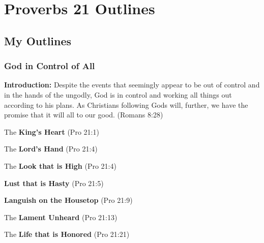 \section{Proverbs 21 Outlines}

\subsection{My Outlines}

\subsubsection{God in Control of All}
\textbf{Introduction:} Despite the events that seemingly appear to be out of control and in the hands of the ungodly, God is in control and working all things out according to his plans. As Christians following Gods will, further, we have the promise that it will all to our good.
 (Romans 8:28)
\begin{compactenum}[I.]
    \item The \textbf{King's Heart}  (Pro 21:1)
    \item The \textbf{Lord's Hand}  (Pro 21:4)
    \item The \textbf{Look that is High}  (Pro 21:4)
    \item \textbf{Lust that is Hasty}  (Pro 21:5)
    \item \textbf{Languish on the Housetop}  (Pro 21:9)
    \item The \textbf{Lament Unheard}  (Pro 21:13)
    \item The \textbf{Life that is Honored}  (Pro 21:21)
\end{compactenum}

